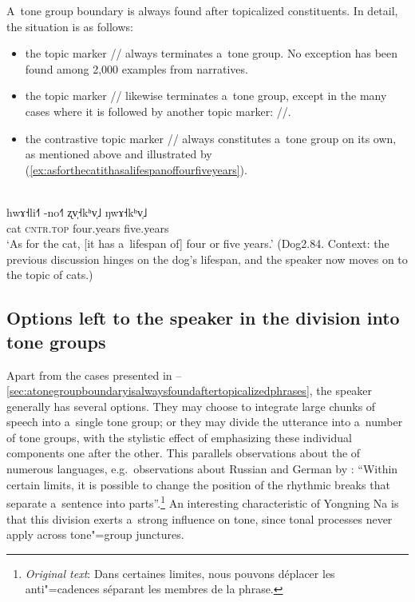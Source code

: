 A~tone group boundary is always found after topicalized constituents. In detail, the situation is as follows: 
\begin{itemize}
\item the topic marker // always terminates a~tone group. No exception has been found among 2,000 examples from narratives.
\item the topic marker // likewise terminates a~tone group, except in the many cases where it is followed by another topic marker: //.
\item the contrastive topic marker // always constitutes a~tone group on its own, as mentioned above and illustrated by (\ref{ex:asforthecatithasalifespanoffourfiveyears}).
\end{itemize}
\begin{exe}
  \ex
  \label{ex:asforthecatithasalifespanoffourfiveyears}
  \\
  \gll hwɤ˧li˧˥	-no˧˥	ʐv̩˧kʰv̩˩		ŋwɤ˧kʰv̩˩\\
  cat		\textsc{cntr.top}	four.years	five.years\\
  \glt ‘As for the cat, [it has a~lifespan of] four or five years.’ (Dog2.84. Context: the previous
  discussion hinges on the dog’s lifespan, and the speaker now moves on to the topic of cats.)
\end{exe}


\subsection[Options left to the speaker]{Options left to the speaker in the division into tone groups}
\label{sec:optionslefttothespeakerinthedivisionintotonegroups}

Apart from the cases presented in --\ref{sec:atonegroupboundaryisalwaysfoundaftertopicalizedphrases}, the speaker generally has several options. They may choose to integrate large chunks of speech into
a~single tone group; or they may divide the utterance into a~number of
tone groups, with the stylistic effect of emphasizing these individual
components one after the other. This parallels observations about the
 of numerous languages, e.g.~observations about Russian and German by \citet[204]{karcevskij1931}:
“Within certain limits, it is possible to change the position of the
rhythmic breaks that separate a~sentence into
parts”.\footnote{\textit{Original text}: Dans certaines limites, nous
  pouvons déplacer les anti"=cadences séparant les membres de la
  phrase.} An interesting characteristic of Yongning Na is that this
division exerts a~strong influence on tone, since tonal
processes never apply across tone"=group junctures.

